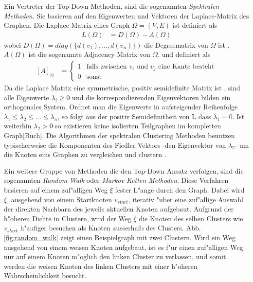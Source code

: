 \documentclass[journal]{vgtc}
\begin{document}
  Ein Vertreter der Top-Down Methoden, sind die sogenannten \emph{Spektralen Methoden}. Sie basieren auf den
  Eigenwerten und Vektoren der Laplace-Matrix des Graphen. Die Laplace Matrix eines Graph
  $\Omega=(V,E)$ ist definiert als
  \begin{align}
    L(\Omega)&=D(\Omega)-A(\Omega)
  \end{align}
  wobei $D(\Omega)=diag(\{d(v_1), ..., d(v_n)\})$ die Degreematrix von $\Omega$ ist \cite{graphcontrol}.
  $A(\Omega)$ ist die sogenannte Adjacency Matrix von $\Omega$, und definiert als
  \begin{align}
   \left[A\right]_{ij}&= \begin{cases}
			    1 & \text{falls zwischen }v_i\text{ und }v_j\text{ eine Kante besteht}\\
			    0 & \text{sonst}
			  \end{cases}
  \end{align}
  Da die Laplace Matrix eine symmetrische, positiv semidefinite Matrix ist \cite{graphcontrol}, sind alle Eigenwerte $\lambda_i \ge 0$
  und die korrespondierenden Eigenvektoren bilden ein orthogonales System. Ordnet man die Eigenwerte in
  aufsteigender Reihenfolge $\lambda_1 \le \lambda_2 \le \dots \le \lambda_n$, so folgt aus der positiv Semidefinitheit
  von L dass $\lambda_1 = 0$. Ist weiterhin $\lambda_2 > 0$ so existieren keine isolierten Teilgraphen im kompletten
  Graph[Buch]. Die Algorithmen der spektralen Clustering Methoden benutzen typischerweise die Komponenten des Fiedler
  Vektors -den Eigenvektor von $\lambda_2$- um die Knoten eins Graphen zu vergleichen und clustern \cite{Schaeffer}.

  Ein weitere Gruppe von Methoden die den Top-Down Ansatz verfolgen, sind die sogenannten \emph{Random Walk} oder
  \emph{Markov Ketten Methoden}. Diese Verfahren basieren auf einem zuf"alligen Weg $\xi$ fester L"ange durch den Graph.
  Dabei wird $\xi$, ausgehend von einem Startknoten $v_{start}$, iterativ "uber eine zuf"allige Auswahl
  der direkten Nachbarn des jeweils aktuellen Knoten aufgebaut. Aufgrund der h"oheren Dichte in Clustern, wird der Weg
  $\xi$ die Knoten des selben Clusters wie $v_{start}$ h"aufiger besuchen als Knoten ausserhalb des Clusters.
  Abb. \ref{fig:random_walk} zeigt einen Beispielgraph mit zwei Clustern. Wird ein Weg ausgehend von einem weisen
  Knoten aufgebaut, ist es f"ur einen zuf"alligen Weg nur auf einem Knoten m"oglich den linken Cluster zu verlassen,
  und somit werden die weisen Knoten des linken Clusters mit einer h"oheren Wahrscheinlichkeit besucht. 
\end{document}
